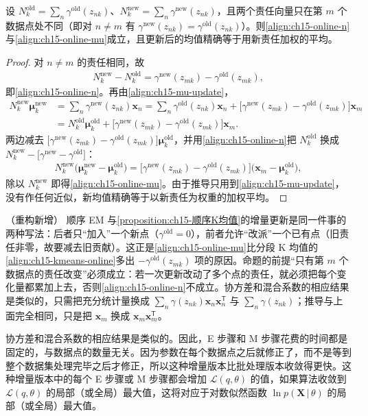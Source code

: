 \documentclass[../../main.tex]{subfiles}
\begin{document}
\begin{proposition}[顺序 EM 的均值更新]\label{proposition:ch15-顺序EM更新}
设 $N_k^{\text{old}}=\sum_n\gamma^{\text{old}}(z_{nk})$、$N_k^{\text{new}}=\sum_n\gamma^{\text{new}}(z_{nk})$，且两个责任向量只在第 $m$ 个数据点处不同（即对 $n\neq m$ 有 $\gamma^{\text{new}}(z_{nk})=\gamma^{\text{old}}(z_{nk})$）。则\eqref{align:ch15-online-n}与\eqref{align:ch15-online-mu}成立，且更新后的均值精确等于用新责任加权的平均。
\end{proposition}
\begin{proof}
对 $n\neq m$ 的责任相同，故
\begin{align*}
N_k^{\text{new}}-N_k^{\text{old}}=\gamma^{\text{new}}(z_{mk})-\gamma^{\text{old}}(z_{mk}),
\end{align*}
即\eqref{align:ch15-online-n}。再由\eqref{align:ch15-mu-update}，
\begin{align*}
N_k^{\text{new}}\bm{\mu}_k^{\text{new}}
&=\sum_{n}\gamma^{\text{new}}(z_{nk})\bm{x}_n
=\sum_{n}\gamma^{\text{old}}(z_{nk})\bm{x}_n+\big[\gamma^{\text{new}}(z_{mk})-\gamma^{\text{old}}(z_{mk})\big]\bm{x}_m\\
&=N_k^{\text{old}}\bm{\mu}_k^{\text{old}}+\big[\gamma^{\text{new}}(z_{mk})-\gamma^{\text{old}}(z_{mk})\big]\bm{x}_m.
\end{align*}
两边减去 $\big[\gamma^{\text{new}}(z_{mk})-\gamma^{\text{old}}(z_{mk})\big]\bm{\mu}_k^{\text{old}}$，并用\eqref{align:ch15-online-n}把 $N_k^{\text{old}}$ 换成 $N_k^{\text{new}}-\big[\gamma^{\text{new}}-\gamma^{\text{old}}\big]$：
\begin{align*}
N_k^{\text{new}}\big(\bm{\mu}_k^{\text{new}}-\bm{\mu}_k^{\text{old}}\big)=\big[\gamma^{\text{new}}(z_{mk})-\gamma^{\text{old}}(z_{mk})\big]\big(\bm{x}_m-\bm{\mu}_k^{\text{old}}\big),
\end{align*}
除以 $N_k^{\text{new}}$ 即得\eqref{align:ch15-online-mu}。由于推导只用到\eqref{align:ch15-mu-update}，没有作任何近似，新均值精确等于以新责任为权重的加权平均。
\end{proof}

\begin{remark}（重构新增）
顺序 EM 与\cref{proposition:ch15-顺序K均值}的增量更新是同一件事的两种写法：后者只“加入”一个新点（$\gamma^{\text{old}}=0$），前者允许“改派”一个已有点（旧责任非零，故要减去旧贡献）。这正是\eqref{align:ch15-online-mu}比分段 K 均值的\eqref{align:ch15-kmeans-online}多出 $-\gamma^{\text{old}}(z_{mk})$ 项的原因。命题的前提“只有第 $m$ 个数据点的责任改变”必须成立：若一次更新改动了多个点的责任，就必须把每个变化量都累加上去，否则\eqref{align:ch15-online-n}不成立。协方差和混合系数的相应结果是类似的，只需把充分统计量换成 $\sum_n\gamma(z_{nk})\bm{x}_n\bm{x}_n^{\mathsf T}$ 与 $\sum_n\gamma(z_{nk})$；推导与上面完全相同，只是把 $\bm{x}_m$ 换成 $\bm{x}_m\bm{x}_m^{\mathsf T}$。
\end{remark}

协方差和混合系数的相应结果是类似的。因此，E 步骤和 M 步骤花费的时间都是固定的，与数据点的数量无关。因为参数在每个数据点之后就修正了，而不是等到整个数据集处理完毕之后才修正，所以这种增量版本比批处理版本收敛得更快。这种增量版本中的每个 E 步骤或 M 步骤都会增加 $\mathcal{L}(q,\theta)$ 的值，如果算法收敛到 $\mathcal{L}(q,\theta)$ 的局部（或全局）最大值，这将对应于对数似然函数 $\ln p(\bm{X}\,|\,\theta)$ 的局部（或全局）最大值。
\end{document}
